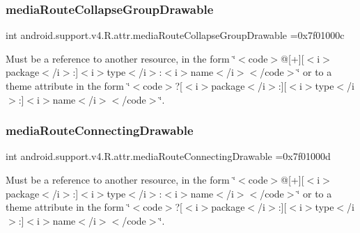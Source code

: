 \subsubsection{\texorpdfstring{media\+Route\+Collapse\+Group\+Drawable}{mediaRouteCollapseGroupDrawable}}
{\footnotesize\ttfamily int android.\+support.\+v4.\+R.\+attr.\+media\+Route\+Collapse\+Group\+Drawable =0x7f01000c\hspace{0.3cm}{\ttfamily [static]}}

Must be a reference to another resource, in the form \char`\"{}$<$code$>$@\mbox{[}+\mbox{]}\mbox{[}$<$i$>$package$<$/i$>$\+:\mbox{]}$<$i$>$type$<$/i$>$\+:$<$i$>$name$<$/i$>$$<$/code$>$\char`\"{} or to a theme attribute in the form \char`\"{}$<$code$>$?\mbox{[}$<$i$>$package$<$/i$>$\+:\mbox{]}\mbox{[}$<$i$>$type$<$/i$>$\+:\mbox{]}$<$i$>$name$<$/i$>$$<$/code$>$\char`\"{}. \mbox{\label{classandroid_1_1support_1_1v4_1_1R_1_1attr_ae3f61fb1dc6d6390ef892df434fcbe97}} 
\subsubsection{\texorpdfstring{media\+Route\+Connecting\+Drawable}{mediaRouteConnectingDrawable}}
{\footnotesize\ttfamily int android.\+support.\+v4.\+R.\+attr.\+media\+Route\+Connecting\+Drawable =0x7f01000d\hspace{0.3cm}{\ttfamily [static]}}

Must be a reference to another resource, in the form \char`\"{}$<$code$>$@\mbox{[}+\mbox{]}\mbox{[}$<$i$>$package$<$/i$>$\+:\mbox{]}$<$i$>$type$<$/i$>$\+:$<$i$>$name$<$/i$>$$<$/code$>$\char`\"{} or to a theme attribute in the form \char`\"{}$<$code$>$?\mbox{[}$<$i$>$package$<$/i$>$\+:\mbox{]}\mbox{[}$<$i$>$type$<$/i$>$\+:\mbox{]}$<$i$>$name$<$/i$>$$<$/code$>$\char`\"{}. \mbox{\label{classandroid_1_1support_1_1v4_1_1R_1_1attr_aca99969b4c224dd397d933c4f89c3cb3}} 
